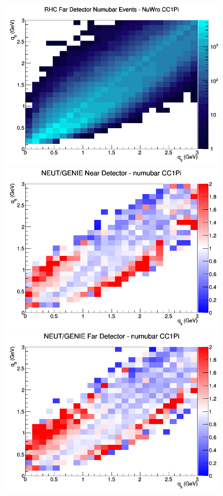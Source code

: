 \begin{figure}[h]
\endminipage
{}
\includegraphics[width=\linewidth]{eff_q0_q3/LAr/CC1Pi_RHC_FD_numubar_q3_q0_NuWro.png}
\endminipage
\newline
{}
\includegraphics[width=\linewidth]{eff_q0_q3/LAr/ratios/CC1Pi_NEUT_GENIE_numubar_near_q3_q0.png}
\endminipage
{}
\includegraphics[width=\linewidth]{eff_q0_q3/LAr/ratios/CC1Pi_NEUT_GENIE_numubar_far_q3_q0.png}

\end{figure}
